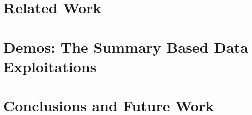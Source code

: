 \documentclass{llncs}
\begin{document}
\section{Related Work}\label{sec:RelatedWork}




\vspace{-5mm}
\section{Demos: The Summary Based Data Exploitations }

%

\vspace{-3mm}
\section{Conclusions and Future Work}\label{sec:Conclusions}





%
\vspace{-5mm}





\clearpage
{} %
\renewcommand{\indexname}{Author Index}
\printindex \clearpage
{} %
\renewcommand{\indexname}{Subject Index}
%
\end{document}
